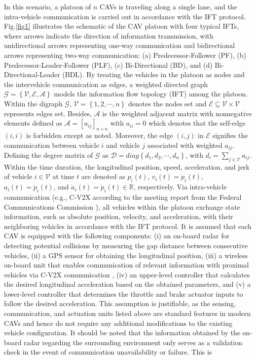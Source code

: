 \documentclass[journal]{IEEEtran}
\begin{document}
In this scenario, a platoon of $n$ CAVs is traveling along a single lane, and the intra-vehicle communication is carried out in accordance with the IFT protocol. Fig.\ref{fig1} illustrates the schematic of the CAV platoon with four typical IFTs, where arrows indicate the direction of information transmission, with unidirectional arrows representing one-way communication and bidirectional arrows representing two-way communication: (a) Predecessor-Follower (PF), (b) Predecessor-Leader-Follower (PLF), (c) Bi-Directional (BD), and (d) Bi-Directional-Leader (BDL). By treating the vehicles in the platoon as nodes and the intervehicle communication as edges, a weighted directed graph $\mathcal{G}=\left\{\mathcal{V},\mathcal{E},\mathcal{A}\right\}$ models the information flow topology (IFT) among the platoon. Within the digraph $\mathcal{G}$, $\mathcal{V} = \left\{ {1,2, \cdots ,n} \right\}$ denotes the nodes set and $\mathcal{E} \subseteq \mathcal{V} \times \mathcal{V} $ represents edges set. Besides, $\mathcal{A}$ is the weighted adjacent matrix with nonnegative elements defined as $\mathcal{A} = {[{a_{ij}}]_{n \times n}}$ with ${a_{ii}} = 0$ which denotes that the self-edge $\left( {i,i} \right)$ is forbidden except as noted. Moreover, the edge $\left( {i,j} \right)$ in $\mathcal{E}$ signifies the communication between vehicle $i$ and vehicle $j$ associated with weighted ${a_{ij}}$. Defining the degree matrix of $\mathcal{G}$ as $\mathcal{D} = diag\left\{ {{d_1},{d_2}, \cdots ,{d_n}} \right\}$, with ${d_i} = \sum\limits_{j \in \mathcal{V}} {{a_{ij}}}$. Within the time duration, the longitudinal position, speed, acceleration, and jerk of vehicle $i \in \mathcal{V}$ at time $t$ are denoted as $p_i\left(t\right)$, $v_i\left(t\right)={\dot{p}}_i\left(t\right)$, $a_i\left(t\right)={\ddot{p}}_i\left(t\right)$, and ${\dot{a}}_i\left(t\right)={\dddot{p}}_i\left(t\right) \in \mathbb{R}$, respectively. Via intra-vehicle communication (e.g., C-V2X according to the meeting report from the Federal Communications Commission \citep{popeo2020federal}), all vehicles within the platoon exchange state information, such as absolute position, velocity, and acceleration, with their neighboring vehicles in accordance with the IFT protocol. It is assumed that each CAV is equipped with the following components: (i) an on-board radar for detecting potential collisions by measuring the gap distance between consecutive vehicles, (ii) a GPS sensor for obtaining the longitudinal position, (iii) a wireless on-board unit that enables communication of relevant information with proximal vehicles via C-V2X communication \citep{VerizonNorth2020}, (iv) an upper-level controller that calculates the desired longitudinal acceleration based on the obtained parameters, and (v) a lower-level controller that determines the throttle and brake actuator inputs to follow the desired acceleration. This assumption is justifiable, as the sensing, communication, and actuation units listed above are standard features in modern CAVs and hence do not require any additional modifications to the existing vehicle configuration. It should be noted that the information obtained by the on-board radar regarding the surrounding environment only serves as a validation check in the event of communication unavailability or failure. This is 
\end{document}
